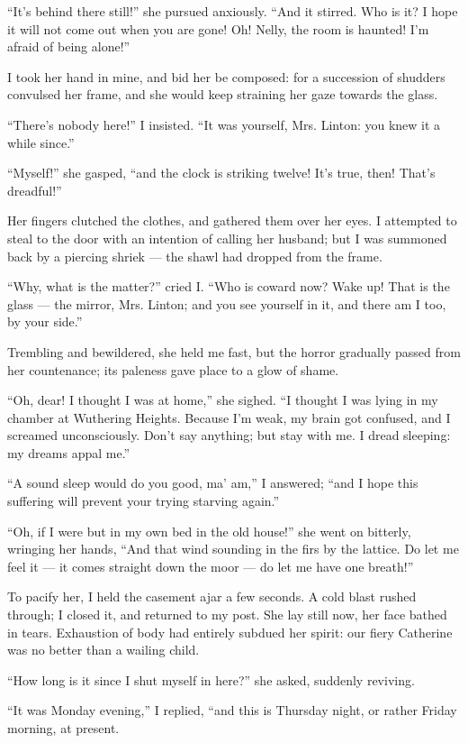 \par “It's behind there still!” she pursued anxiously. “And it stirred. Who is it? I hope it will not come out when you are gone! Oh! Nelly, the room is haunted! I'm afraid of being alone!”
\par I took her hand in mine, and bid her be composed: for a succession of shudders convulsed her frame, and she would keep straining her gaze towards the glass.
\par “There's nobody here!” I insisted. “It was yourself, Mrs. Linton: you knew it a while since.”
\par “Myself!” she gasped, “and the clock is striking twelve! It's true, then! That's dreadful!”
\par Her fingers clutched the clothes, and gathered them over her eyes. I attempted to steal to the door with an intention of calling her husband; but I was summoned back by a piercing shriek — the shawl had dropped from the frame.
\par “Why, what is the matter?” cried I. “Who is coward now? Wake up! That is the glass — the mirror, Mrs. Linton; and you see yourself in it, and there am I too, by your side.”
\par Trembling and bewildered, she held me fast, but the horror gradually passed from her countenance; its paleness gave place to a glow of shame.
\par “Oh, dear! I thought I was at home,” she sighed. “I thought I was lying in my chamber at Wuthering Heights. Because I'm weak, my brain got confused, and I screamed unconsciously. Don't say anything; but stay with me. I dread sleeping: my dreams appal me.”
\par “A sound sleep would do you good, ma' am,” I answered; “and I hope this suffering will prevent your trying starving again.”
\par “Oh, if I were but in my own bed in the old house!” she went on bitterly, wringing her hands, “And that wind sounding in the firs by the lattice. Do let me feel it — it comes straight down the moor — do let me have one breath!”
\par To pacify her, I held the casement ajar a few seconds. A cold blast rushed through; I closed it, and returned to my post. She lay still now, her face bathed in tears. Exhaustion of body had entirely subdued her spirit: our fiery Catherine was no better than a wailing child.
\par “How long is it since I shut myself in here?” she asked, suddenly reviving.
\par “It was Monday evening,” I replied, “and this is Thursday night, or rather Friday morning, at present.
